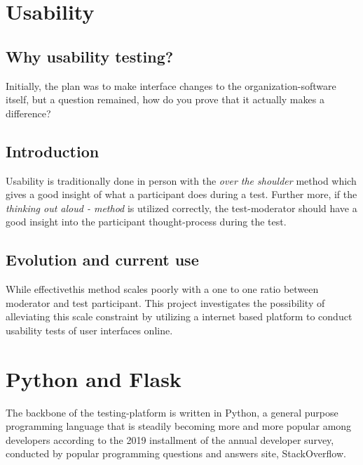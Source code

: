 \section{Usability}

  \subsection{Why usability testing?}

    Initially, the plan was to make interface changes to the
    organization-software itself, but a question remained, how do you prove
    that it actually makes a difference?


  \subsection{Introduction}

    Usability is traditionally done in person with the \textit{over the
    shoulder} method which gives a good insight of what a participant does
    during a test. Further more, if the \textit{thinking out aloud -
    method} is utilized correctly, the test-moderator should have a good
    insight into the participant thought-process during the test.

  \subsection{Evolution and current use}

    While effective\checkTruth this method scales poorly with a one to one
    ratio between moderator and test participant. This project investigates
    the possibility of alleviating this scale constraint by utilizing a
    internet based platform to conduct usability tests of user interfaces
    online.



\section{Python and Flask}

  The backbone of the testing-platform is written in  Python\cite{citePython},
  a general purpose programming language that is steadily becoming
  more and more popular among developers according to the 2019 installment of
  the annual developer survey\cite{citeStackOverflow2019Survey},
  conducted by popular programming questions and answers site,
  StackOverflow\cite{citeStackOverflow}.

